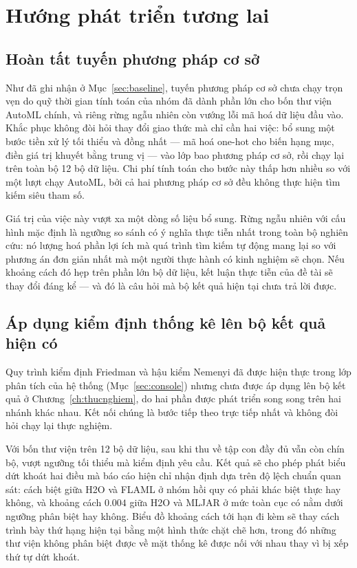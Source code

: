 \section{Hướng phát triển tương lai}
\label{sec:huongphattrien}

\subsection{Hoàn tất tuyến phương pháp cơ sở}
Như đã ghi nhận ở Mục~\ref{sec:baseline}, tuyến phương pháp cơ sở chưa chạy trọn
vẹn do quỹ thời gian tính toán của nhóm đã dành phần lớn cho bốn thư viện AutoML
chính, và riêng rừng ngẫu nhiên còn vướng lỗi mã hoá dữ liệu đầu vào. Khắc phục
không đòi hỏi thay đổi giao thức mà chỉ cần hai việc: bổ sung một bước tiền xử lý
tối thiểu và đồng nhất --- mã hoá one-hot cho biến hạng mục, điền giá trị khuyết
bằng trung vị --- vào lớp bao phương pháp cơ sở, rồi chạy lại trên toàn bộ 12 bộ
dữ liệu. Chi phí tính toán cho bước này thấp hơn nhiều so với một lượt chạy AutoML,
bởi cả hai phương pháp cơ sở đều không thực hiện tìm kiếm siêu tham số.

Giá trị của việc này vượt xa một dòng số liệu bổ sung. Rừng ngẫu nhiên với cấu
hình mặc định là ngưỡng so sánh có ý nghĩa thực tiễn nhất trong toàn bộ nghiên
cứu: nó lượng hoá phần lợi ích mà quá trình tìm kiếm tự động mang lại so với
phương án đơn giản nhất mà một người thực hành có kinh nghiệm sẽ chọn. Nếu khoảng
cách đó hẹp trên phần lớn bộ dữ liệu, kết luận thực tiễn của đề tài sẽ thay đổi
đáng kể --- và đó là câu hỏi mà bộ kết quả hiện tại chưa trả lời được.

\subsection{Áp dụng kiểm định thống kê lên bộ kết quả hiện có}
Quy trình kiểm định Friedman và hậu kiểm Nemenyi đã được hiện thực trong lớp phân
tích của hệ thống (Mục~\ref{sec:console}) nhưng chưa được áp dụng lên bộ kết quả ở
Chương~\ref{ch:thucnghiem}, do hai phần được phát triển song song trên hai nhánh
khác nhau. Kết nối chúng là bước tiếp theo trực tiếp nhất và không đòi hỏi chạy
lại thực nghiệm.

Với bốn thư viện trên 12 bộ dữ liệu, sau khi thu về tập con đầy đủ vẫn còn chín bộ,
vượt ngưỡng tối thiểu mà kiểm định yêu cầu. Kết quả sẽ cho phép phát biểu dứt khoát
hai điều mà báo cáo hiện chỉ nhận định dựa trên độ lệch chuẩn quan sát: cách biệt
giữa H2O và FLAML ở nhóm hồi quy có phải khác biệt thực hay không, và khoảng cách
$0.004$ giữa H2O và MLJAR ở mức toàn cục có nằm dưới ngưỡng phân biệt hay không.
Biểu đồ khoảng cách tới hạn đi kèm sẽ thay cách trình bày thứ hạng hiện tại bằng
một hình thức chặt chẽ hơn, trong đó những thư viện không phân biệt được về mặt
thống kê được nối với nhau thay vì bị xếp thứ tự dứt khoát.


